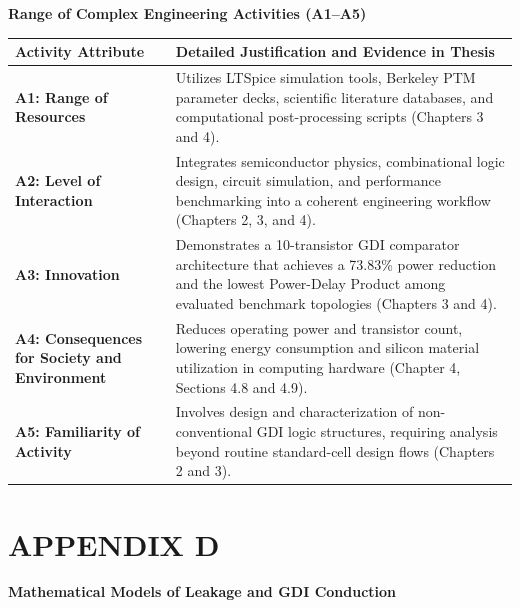 \documentclass[12pt,a4paper,oneside]{report}
\begin{document}
\noindent\textbf{Range of Complex Engineering Activities (A1--A5)}

\vspace{0.5cm}

\begin{table}[H]
\centering
\begin{tabular}{|p{3.5cm}|p{10.2cm}|}
\hline
\textbf{Activity Attribute} & \textbf{Detailed Justification and Evidence in Thesis} \\
\hline
\textbf{A1: Range of Resources} & Utilizes LTSpice simulation tools, Berkeley PTM parameter decks, scientific literature databases, and computational post-processing scripts (Chapters 3 and 4). \\
\hline
\textbf{A2: Level of Interaction} & Integrates semiconductor physics, combinational logic design, circuit simulation, and performance benchmarking into a coherent engineering workflow (Chapters 2, 3, and 4). \\
\hline
\textbf{A3: Innovation} & Demonstrates a 10-transistor GDI comparator architecture that achieves a 73.83\% power reduction and the lowest Power-Delay Product among evaluated benchmark topologies (Chapters 3 and 4). \\
\hline
\textbf{A4: Consequences for Society and Environment} & Reduces operating power and transistor count, lowering energy consumption and silicon material utilization in computing hardware (Chapter 4, Sections 4.8 and 4.9). \\
\hline
\textbf{A5: Familiarity of Activity} & Involves design and characterization of non-conventional GDI logic structures, requiring analysis beyond routine standard-cell design flows (Chapters 2 and 3). \\
\hline
\end{tabular}
\end{table}


\clearpage
\chapter*{APPENDIX D}

\noindent\textbf{Mathematical Models of Leakage and GDI Conduction}

\vspace{0.5cm}
\end{document}
